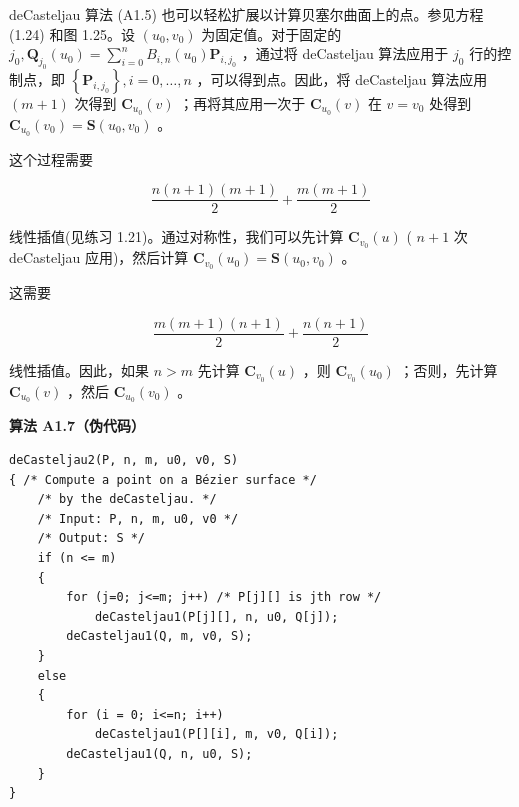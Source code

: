 \documentclass[../main.tex]{subfiles}
\begin{document}
\noindent\begin{minipage}{\linewidth}
deCasteljau 算法 (A1.5) 也可以轻松扩展以计算贝塞尔曲面上的点。参见方程 (1.24) 和图 1.25。设 \(\left( {{u}_{0},{v}_{0}}\right)\) 为固定值。对于固定的 \({j}_{0},{\mathbf{Q}}_{{j}_{0}}\left( {u}_{0}\right)  = \mathop{\sum }\limits_{{i = 0}}^{n}{B}_{i,n}\left( {u}_{0}\right) {\mathbf{P}}_{i,{j}_{0}}\) ，通过将 deCasteljau 算法应用于 \({j}_{0}\) 行的控制点，即 \(\left\{  {\mathbf{P}}_{i,{j}_{0}}\right\}  ,i = 0,\ldots ,n\) ，可以得到点。因此，将 deCasteljau 算法应用 \(\left( {m + 1}\right)\) 次得到 \({\mathbf{C}}_{{u}_{0}}\left( v\right)\) ；再将其应用一次于 \({\mathbf{C}}_{{u}_{0}}\left( v\right)\) 在 \(v = {v}_{0}\) 处得到 \({\mathbf{C}}_{{u}_{0}}\left( {v}_{0}\right)  = \mathbf{S}\left( {{u}_{0},{v}_{0}}\right)\) 。
\begin{center}
\begin{minipage}{24.6cm}
\centering
{}
\captionsetup{font=small,skip=6pt,justification=centering}
\end{minipage}
\end{center}
\end{minipage}
\par\medskip

这个过程需要

\[
\frac{n\left( {n + 1}\right) \left( {m + 1}\right) }{2} + \frac{m\left( {m + 1}\right) }{2} \tag{1.25}
\]


线性插值(见练习 1.21)。通过对称性，我们可以先计算 \({\mathbf{C}}_{{v}_{0}}\left( u\right)\) ( \(n + 1\) 次 deCasteljau 应用)，然后计算 \({\mathbf{C}}_{{v}_{0}}\left( {u}_{0}\right)  = \mathbf{S}\left( {{u}_{0},{v}_{0}}\right)\) 。

这需要

\[
\frac{m\left( {m + 1}\right) \left( {n + 1}\right) }{2} + \frac{n\left( {n + 1}\right) }{2} \tag{1.26}
\]

线性插值。因此，如果 \(n > m\) 先计算 \({\mathbf{C}}_{{v}_{0}}\left( u\right)\) ，则 \({\mathbf{C}}_{{v}_{0}}\left( {u}_{0}\right)\) ；否则，先计算 \({\mathbf{C}}_{{u}_{0}}\left( v\right)\) ，然后 \({\mathbf{C}}_{{u}_{0}}\left( {v}_{0}\right)\) 。

\par\medskip\noindent\textbf{算法 A1.7（伪代码）}\par
\begin{verbatim}
deCasteljau2(P, n, m, u0, v0, S)
{ /* Compute a point on a Bézier surface */
    /* by the deCasteljau. */
    /* Input: P, n, m, u0, v0 */
    /* Output: S */
    if (n <= m)
    {
        for (j=0; j<=m; j++) /* P[j][] is jth row */
            deCasteljau1(P[j][], n, u0, Q[j]);
        deCasteljau1(Q, m, v0, S);
    }
    else
    {
        for (i = 0; i<=n; i++)
            deCasteljau1(P[][i], m, v0, Q[i]);
        deCasteljau1(Q, n, u0, S);
    }
}
\end{verbatim}
\end{document}
